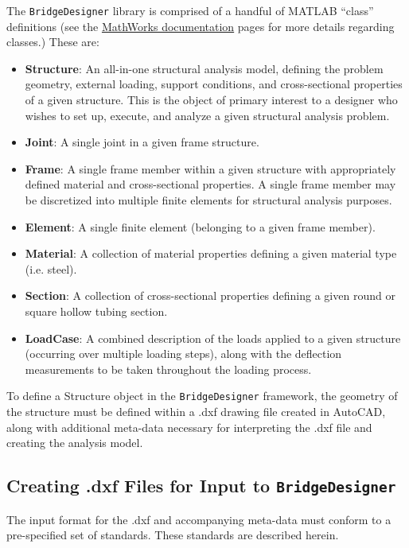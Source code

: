 \documentclass[12pt,a4paper,article]{memoir} %
\begin{document}
The \texttt{BridgeDesigner} library is comprised of a handful of MATLAB ``class'' definitions (see the \href{https://www.mathworks.com/help/matlab/matlab_oop/classes-in-the-matlab-language.html}{MathWorks documentation} pages for more details regarding classes.) These are:
\begin{itemize}
	\item[] \textbf{Structure}: An all-in-one structural analysis model, defining the problem geometry, external loading, support conditions, and cross-sectional properties of a given structure. This is the object of primary interest to a designer who wishes to set up, execute, and analyze a given structural analysis problem.
	\item[] \textbf{Joint}: A single joint in a given frame structure.
	\item[] \textbf{Frame}: A single frame member within a given structure with appropriately defined material and cross-sectional properties. A single frame member may be discretized into multiple finite elements for structural analysis purposes.
	\item[] \textbf{Element}: A single finite element (belonging to a given frame member).
	\item[] \textbf{Material}: A collection of material properties defining a given material type (i.e. steel).
	\item[] \textbf{Section}: A collection of cross-sectional properties defining a given round or square hollow tubing section.
	\item[] \textbf{LoadCase}: A combined description of the loads applied to a given structure (occurring over multiple loading steps), along with the deflection measurements to be taken throughout the loading process.
\end{itemize}



To define a Structure object in the \texttt{BridgeDesigner} framework, the geometry of the structure must be defined within a .dxf drawing file created in AutoCAD, along with additional meta-data necessary for interpreting the .dxf file and creating the analysis model.

\subsection{Creating .dxf Files for Input to \texttt{BridgeDesigner}}

The input format for the .dxf and accompanying meta-data must conform to a pre-specified set of standards. These standards are described herein.
\end{document}
